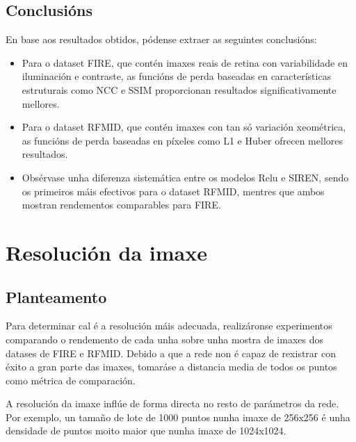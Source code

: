 \subsection{Conclusións}
\label{subsec:Conclusions-loss}

En base aos resultados obtidos, pódense extraer as seguintes conclusións:
\begin{itemize}
    \item Para o dataset FIRE, que contén imaxes reais de retina con variabilidade en iluminación e contraste, as funcións de perda baseadas en características estruturais como NCC e SSIM proporcionan resultados significativamente mellores.
    \item Para o dataset RFMID, que contén imaxes con tan só variación xeométrica, as funcións de perda baseadas en píxeles como L1 e Huber ofrecen mellores resultados.
    \item Obsérvase unha diferenza sistemática entre os modelos Relu e SIREN, sendo os primeiros máis efectivos para o dataset RFMID, mentres que ambos mostran rendementos comparables para FIRE.
\end{itemize}


\section{Resolución da imaxe}
\label{sec:Resolución da imaxe}

\subsection{Planteamento}
\label{subsec:Planteamento-resolution}

Para determinar cal é a resolución máis adecuada, realizáronse experimentos comparando o rendemento de cada unha sobre unha mostra de imaxes dos datases de FIRE e RFMID.
Debido a que a rede non é capaz de rexistrar con éxito a gran parte das imaxes, tomaráse a distancia media de todos os puntos como métrica de comparación.

A resolución da imaxe inflúe de forma directa no resto de parámetros da rede.
Por exemplo, un tamaño de lote de 1000 puntos nunha imaxe de 256x256 é unha densidade de puntos moito maior que nunha imaxe de 1024x1024.


